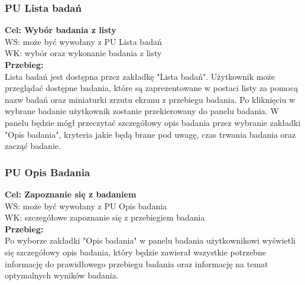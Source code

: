 \documentclass[12pt, letterpaper]{article}
\begin{document}
		\subsubsection{PU Lista badań}
		
		\quad
		
		\textbf{Cel: Wybór badania z listy}\\
		
		WS: może być wywołany z PU Lista badań\\
		
		WK: wybór oraz wykonanie badania z listy\\
		
		\textbf{Przebieg:}\\
		Lista badań jest dostępna przez zakładkę "Lista badań". Użytkownik może przeglądać dostępne badania, które są zaprezentowane w postaci listy za pomocą nazw badań oraz miniaturki zrzutu ekranu z przebiegu badania. Po kliknięciu w wybrane badanie użytkownik zostanie przekierowany do panelu badania. W panelu będzie mógł przeczytać szczegółowy opis badania przez wybranie zakładki "Opis badania", kryteria jakie będą brane pod uwagę, czas trwania badania oraz zacząć badanie. \\
		
		
		\subsubsection{PU Opis Badania}
		
		\quad
		
		\textbf{Cel: Zapoznanie się z badaniem}\\
		
		WS: może być wywołany z PU Opis badania\\
		
		WK: szczegółowe zapoznanie się z przebiegiem badania \\
		
		\textbf{Przebieg:}\\
		Po wyborze zakładki "Opis badania" w panelu badania użytkownikowi wyświetli się szczegółowy opis badania, który będzie zawierał wszystkie potrzebne informację do prawidłowego przebiegu badania oraz informację na temat optymalnych wyników badania. \\
		
		
\end{document}
